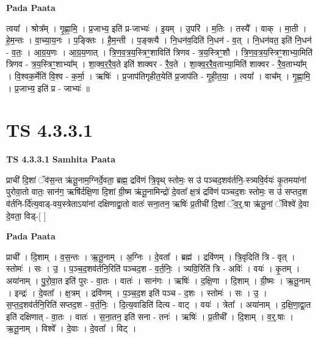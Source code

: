 \documentclass[17pt]{extarticle}
\begin{document}
\textbf{Pada Paata} \newline

त्वया᳚ । श्रोत्र᳚म् । गृ॒ह्णा॒मि॒ । प्र॒जाभ्य॒ इति॑ प्र-जाभ्यः॑ । इ॒यम् । उ॒परि॑ । म॒तिः । तस्यै᳚ । वाक् । मा॒ती । हे॒म॒न्तः । वा॒च्या॒य॒नः । प॒ङ्क्तिः । है॒म॒न्ती । प॒ङ्क्त्यै । नि॒धन॑व॒दिति॑ नि॒धन॑ - व॒त् । नि॒धन॑वत॒ इति॑ नि॒धन॑ - व॒तः॒ । आ॒ग्र॒य॒णः । आ॒ग्र॒य॒णात् । त्रि॒ण॒व॒त्र॒य॒स्त्रिꣳ॒॒शाविति॑ त्रिणव - त्र॒य॒स्त्रिꣳ॒॒शौ । त्रि॒ण॒व॒त्र॒य॒स्त्रिꣳ॒॒शाभ्या॒मिति॑ त्रिणव - त्र॒य॒स्त्रिꣳ॒॒शाभ्या᳚म् । शा॒क्व॒र॒रै॒व॒ते इति॑ शाक्वर - रै॒व॒ते । शा॒क्व॒र॒रै॒व॒ताभ्या॒मिति॑ शाक्वर - रै॒व॒ताभ्या᳚म् । वि॒श्वक॒र्मेति॑ वि॒श्व - क॒र्मा॒ । ऋषिः॑ । प्र॒जाप॑तिगृहीत॒येति॑ प्र॒जाप॑ति - गृ॒ही॒त॒या॒ । त्वया᳚ । वाच᳚म् । गृ॒ह्णा॒मि॒ । प्र॒जाभ्य॒ इति॑ प्र - जाभ्यः॑ ॥  \newline




\section*{ TS 4.3.3.1 }

\textbf{TS 4.3.3.1 } \newline
\textbf{Samhita Paata} \newline

प्राची॑ दि॒शां ॅव॑स॒न्त ऋ॑तू॒नाम॒ग्निर्दे॒वता॒ ब्रह्म॒ द्रवि॑णं त्रि॒वृथ् स्तोमः॒ स उ॑ पञ्चद॒शव॑र्तनि॒-स्त्र्यवि॒र्वयः॑ कृ॒तमया॑नां पुरोवा॒तो वातः॒ सान॑ग॒ ऋषि॑र्दक्षि॒णा दि॒शां ग्री॒ष्म ऋ॑तू॒नामिन्द्रो॑ दे॒वता᳚ क्ष॒त्रं द्रवि॑णं पञ्चद॒शः स्तोमः॒ स उ॑ सप्तद॒श व॑र्तनि-र्दि॑त्य॒वाड्-वय॒स्त्रेताऽया॑नां दक्षिणाद्वा॒तो वातः॑ सना॒तन॒ ऋषिः॑ प्र॒तीची॑ दि॒शां ॅव॒र्॒.षा ऋ॑तू॒नां ॅविश्वे॑ दे॒वा दे॒वता॒ विड्-[  ] \newline

\textbf{Pada Paata} \newline

प्राची᳚ । दि॒शाम् । व॒स॒न्तः । ऋ॒तू॒नाम् । अ॒ग्निः । दे॒वता᳚ । ब्रह्म॑ । द्रवि॑णम् । त्रि॒वृदिति॑ त्रि - वृत् । स्तोमः॑ । सः । उ॒ । प॒ञ्च॒द॒शव॑र्तनि॒रिति॑ पञ्चद॒श - व॒र्त॒निः॒ । त्र्यवि॒रिति॑ त्रि - अविः॑ । वयः॑ । कृ॒तम् । अया॑नाम् । पु॒रो॒वा॒त इति॑ पुरः - वा॒तः । वातः॑ । सान॑गः । ऋषिः॑ । द॒क्षि॒णा । दि॒शाम् । ग्री॒ष्मः । ऋ॒तू॒नाम् । इन्द्रः॑ । दे॒वता᳚ । क्ष॒त्रम् । द्रवि॑णम् । प॒ञ्च॒द॒श इति॑ पञ्च - द॒शः । स्तोमः॑ । सः । उ॒ । स॒प्त॒द॒शव॑र्तनि॒रिति॑ सप्तद॒श - व॒र्त॒निः॒ । दि॒त्य॒वाडिति॑ दित्य - वाट् । वयः॑ । त्रेता᳚ । अया॑नाम् । द॒क्षि॒णा॒द्वा॒त इति॑ दक्षिणात् - वा॒तः । वातः॑ । स॒ना॒तन॒ इति॑ सना - तनः॑ । ऋषिः॑ । प्र॒तीची᳚ । दि॒शाम् । व॒र्॒.षाः । ऋ॒तू॒नाम् । विश्वे᳚ । दे॒वाः । दे॒वता᳚ । विट् ।  \newline
\end{document}
